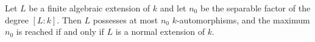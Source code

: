 Let $L$ be a finite algebraic extension of $k$ and let $n_0$ be the separable factor of the degree $[L:k]$. Then $L$ possesses at most $n_0$ $k$-automorphisms, and the maximum $n_0$ is reached if and only if $L$ is a normal extension of $k$.
